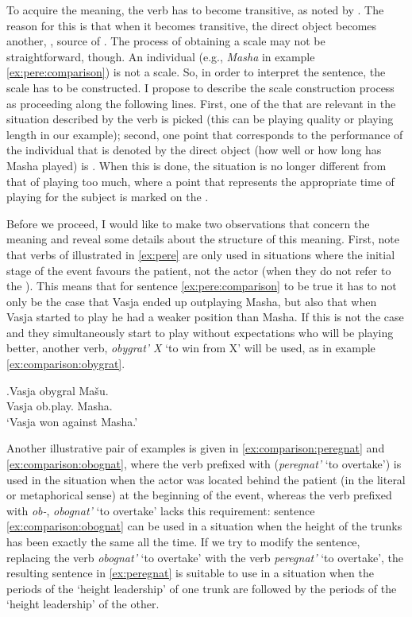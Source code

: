 To acquire the  meaning, the verb has to become transitive, as noted by \citet{Shvedova:82}. The reason for this is that when it becomes transitive, the direct object becomes another, , source of . The process of obtaining a scale may not be straightforward, though. An individual (e.g., \textit{Masha} in example \ref{ex:pere:comparison}) is not a scale. So, in order to interpret the sentence, the scale has to be constructed. I propose to describe the scale construction process as proceeding along the following lines. First, one of the  that are relevant in the situation described by the verb is picked (this can be playing quality or playing length in our example); second, one point that corresponds to the performance of the individual that is denoted by the direct object (how well or how long has Masha played) is . When this is done, the situation is no longer different from that of playing too much, where a point that represents the appropriate time of playing for the subject is marked on the .

Before we proceed, I would like to make two observations that concern the  meaning and reveal some details about the structure of this meaning. First, note that verbs of  illustrated in \ref{ex:pere} are only used in situations where the initial stage of the event favours the patient, not the actor (when they do not refer to the ). This means that for sentence \ref{ex:pere:comparison} to be true it has to not only be the case that Vasja ended up outplaying Masha, but also that when Vasja started to play he had a weaker position than Masha. If this is not the case and they simultaneously start to play without expectations who will be playing better, another verb, \textit{obygrat' X} `to win from X' will be used, as in example \ref{ex:comparison:obygrat}. 

\exg.\label{ex:comparison:obygrat}Vasja obygral Ma\v{s}u.\\
Vasja ob.play. Masha.\\
\trans `Vasja won against Masha.'

Another illustrative pair of examples is given in \ref{ex:comparison:peregnat} and \ref{ex:comparison:obognat}, where the verb prefixed with  (\textit{peregnat'} `to overtake') is used in the situation when the actor was located behind the patient (in the literal or metaphorical sense) at the beginning of the event, whereas the verb prefixed with {\textit{ob-},} \textit{obognat'} `to overtake' lacks this requirement: sentence \ref{ex:comparison:obognat} can be used in a situation when the height of the trunks has been exactly the same all the time. If we try to modify the sentence, replacing the verb \textit{obognat'} `to overtake' with the verb \textit{peregnat'} `to overtake', the resulting sentence in \ref{ex:peregnat} is suitable to use in a situation when the periods of the `height leadership' of one trunk are followed by the periods of the `height leadership' of the other.

